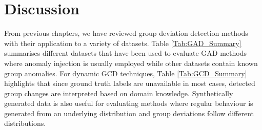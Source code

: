  \chapter{Discussion} \label{chpt:disc}
From previous chapters, we have reviewed group deviation detection methods with their application to a variety of datasets. 
Table \ref{Tab:GAD_Summary}  summarises  different datasets that have been used to evaluate GAD methods where anomaly injection is usually employed while other datasets contain known group anomalies. For dynamic GCD techniques, Table \ref{Tab:GCD_Summary} highlights that since  ground truth labels are unavailable in most cases, detected group changes are interpreted based on domain knowledge.
Synthetically generated data is also useful for  evaluating methods %
where regular behaviour is generated from an underlying distribution and group deviations follow different distributions. 
 
